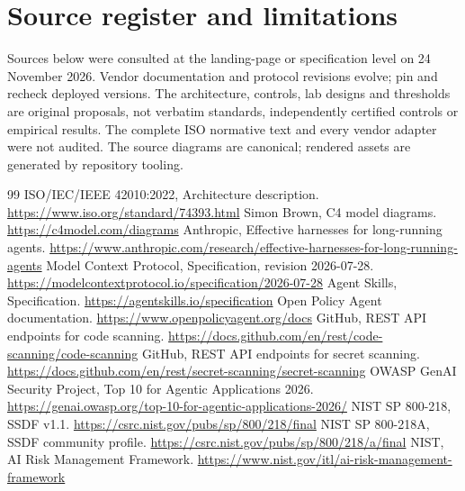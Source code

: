 \documentclass[11pt,letterpaper]{article}
\begin{document}
\section{Source register and limitations}
Sources below were consulted at the landing-page or specification level on 24 November 2026. Vendor documentation and protocol revisions evolve; pin and recheck deployed versions. The architecture, controls, lab designs and thresholds are original proposals, not verbatim standards, independently certified controls or empirical results. The complete ISO normative text and every vendor adapter were not audited. The source diagrams are canonical; rendered assets are generated by repository tooling.
\begin{thebibliography}{99}
 ISO/IEC/IEEE 42010:2022, Architecture description. \url{https://www.iso.org/standard/74393.html}
 Simon Brown, C4 model diagrams. \url{https://c4model.com/diagrams}
 Anthropic, Effective harnesses for long-running agents. \url{https://www.anthropic.com/research/effective-harnesses-for-long-running-agents}
 Model Context Protocol, Specification, revision 2026-07-28. \url{https://modelcontextprotocol.io/specification/2026-07-28}
 Agent Skills, Specification. \url{https://agentskills.io/specification}
 Open Policy Agent documentation. \url{https://www.openpolicyagent.org/docs}
 GitHub, REST API endpoints for code scanning. \url{https://docs.github.com/en/rest/code-scanning/code-scanning}
 GitHub, REST API endpoints for secret scanning. \url{https://docs.github.com/en/rest/secret-scanning/secret-scanning}
 OWASP GenAI Security Project, Top 10 for Agentic Applications 2026. \url{https://genai.owasp.org/top-10-for-agentic-applications-2026/}
 NIST SP 800-218, SSDF v1.1. \url{https://csrc.nist.gov/pubs/sp/800/218/final}
 NIST SP 800-218A, SSDF community profile. \url{https://csrc.nist.gov/pubs/sp/800/218/a/final}
 NIST, AI Risk Management Framework. \url{https://www.nist.gov/itl/ai-risk-management-framework}
\end{thebibliography}
\end{document}
